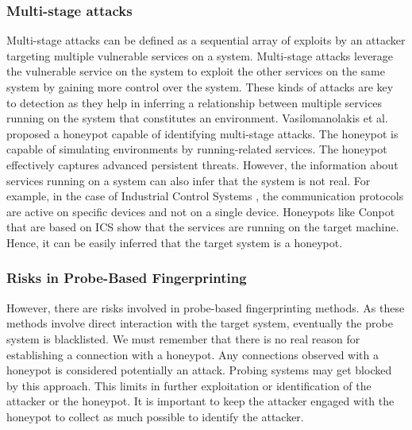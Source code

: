 \subsubsection{Multi-stage attacks}
Multi-stage attacks can be defined as a sequential array of exploits by an attacker targeting multiple vulnerable services on a system. Multi-stage attacks leverage the vulnerable service on the system to exploit the other services on the same system by gaining more control over the system. These kinds of attacks are key to detection as they help in inferring a relationship between multiple services running on the system that constitutes an environment. Vasilomanolakis et al. \cite{vasilomanolakis} proposed a honeypot capable of identifying multi-stage attacks. The honeypot is capable of simulating environments by running-related services. The honeypot effectively captures advanced persistent threats. However, the information about services running on a system can also infer that the system is not real. For example, in the case of Industrial Control Systems , the communication protocols are active on specific devices and not on a single device. Honeypots like Conpot that are based on ICS show that the services are running on the target machine. Hence, it can be easily inferred that the target system is a honeypot. 

\subsubsection{Risks in Probe-Based Fingerprinting}
However, there are risks involved in probe-based fingerprinting methods. As these methods involve direct interaction with the target system, eventually the probe system is blacklisted. We must remember that there is no real reason for establishing a connection with a honeypot. Any connections observed with a honeypot is considered potentially an attack. Probing systems may get blocked by this approach. This limits in further exploitation or identification of the attacker or the honeypot. It is important to keep the attacker engaged with the honeypot to collect as much possible to identify the attacker. 

